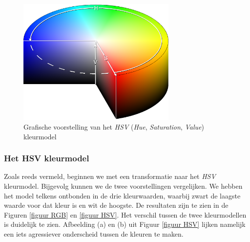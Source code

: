\documentclass[a4paper,kulak]{kulakarticle}
\begin{document}
	\begin{figure}[h]
		\centering
		\includegraphics[width=0.7\textwidth]{HSV_vb.png}
		
		\caption{Grafische voorstelling van het \textit{HSV} (\textit{Hue}, \textit{Saturation}, \textit{Value}) kleurmodel}
		\label{figuur hsv_schema}
	\end{figure}

	\subsubsection{Het HSV kleurmodel}
		Zoals reeds vermeld, beginnen we met een transformatie naar het \textit{HSV} kleurmodel. Bijgevolg kunnen we de twee voorstellingen vergelijken. We hebben het model telkens ontbonden in de drie kleurwaarden, waarbij zwart de laagste waarde voor dat kleur is en wit de hoogste. De resultaten zijn te zien in de Figuren \ref{figuur RGB} en \ref{figuur HSV}. Het verschil tussen de twee kleurmodellen is duidelijk te zien. Afbeelding (a) en (b) uit Figuur \ref{figuur HSV} lijken namelijk een iets agressiever onderscheid tussen de kleuren te maken.
\end{document}
